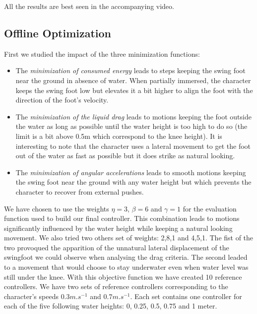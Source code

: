 \documentclass[conference]{acmsiggraph}
\begin{document}
All the results are best seen in the accompanying video.

\subsection{Offline Optimization}
First we studied the impact of the three minimization functions:
\begin{itemize}
\item\begin{minipage}[t]{\linewidth}{
The \textit{minimization of consumed energy} leads to steps keeping the swing foot near the ground in absence of water. When partially immersed, the character keeps the swing foot low but elevates it a bit higher to align the foot with the direction of the foot's velocity.}
\end{minipage}
\item\begin{minipage}[t]{\linewidth}{
The \textit{minimization of the liquid drag} leads to motions keeping the foot outside the water as long as possible until the water height is too high to do so (the limit is a bit above 0.5m which correspond to the knee height). It is interesting to note that the character uses a lateral movement to get the foot out of the water as fast as possible but it does strike as natural looking.}
\end{minipage}
\item\begin{minipage}[t]{\linewidth}{
The \textit{minimization of angular accelerations} leads to smooth motions keeping the swing foot near the ground with any water height but which prevents the character to recover from external pushes.}
\end{minipage}
\end{itemize}
We have chosen to use the weights $\eta=3$, $\beta=6$ and $\gamma=1$ for the evaluation function used to build our final controller. This combination leads to motions significantly influenced by the water height while keeping a natural looking movement. We also tried two others set of weights: 2,8,1 and 4,5,1. The fist of the two provoqued the apparition of the unnatural lateral displacement of the swingfoot we could observe when analysing the drag criteria. The second leaded to a movement that would choose to stay underwater even when water level was still under the knee.
With this objective function we have created 10 reference controllers. We have two sets of reference controllers corresponding to the character's speeds $0.3m.s^{-1}$ and $0.7m.s^{-1}$. Each set contains one controller for each of the five following water heights: 0, 0.25, 0.5, 0.75 and 1 meter.
\end{document}
